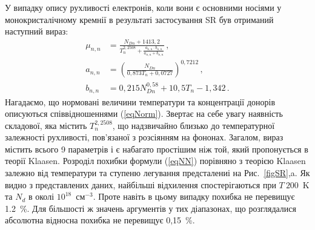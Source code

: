\documentclass[12pt,a4paper,titlepage,oneside]{book}
\numberwithin{equation}{part}
\begin{document}
У випадку опису рухливості електронів, коли вони є основними носіями у монокристалічному кремнії в результаті застосування SR був отриманий
наступний вираз:
\begin{subequations} \label{eqNN}
    \begin{align}
      \mu_{n,n}& =\frac{N_{Dn}+1413,2}{T_n^{2,2508}+\frac{a_{n,n}\cdot b_{n,n}}{a_{n,n}+b_{n,n}}}\,, \label{eqNNa} \\
      a_{n,n} &=\left(\frac{N_{Dn}}{0,873T_n+0,0727}\right)^{0,7212}\,, \label{eqNNb} \\
      b_{n,n}& =0,215N_{Dn}^{0,58}+10,5T_n-1,342\,. \label{eqNNc}
    \end{align}
\end{subequations}
Нагадаємо, що нормовані величини температури та концентрації донорів описуються співвідношеннями (\ref{eqNorm}).
Звертає на себе увагу наявність складової, яка містить $T_n^{2,2508}$, що надзвичайно близько до
температурної залежності рухливості, пов'язаної з розсіянням на фононах.
Загалом, вираз містить всього 9 параметрів і є набагато простішим ніж той, який пропонується в теорії Klaasen.
Розроділ похибки формули (\ref{eqNN}) порівняно з теорією  Klaasen залежно від температури та ступеню легування предсталениі на Рис.~\ref{figSR},a.
Як видно з представлених даних, найбільші відхилення спостерігаються при $T~200$~K та $N_d$ в околі $10^{18}$~см$^{-3}$.
Проте навіть в цьому випадку похибка не перевищує 1.2~\%.
Для більшості ж значень аргументів у тих діапазонах, що розглядалися абсолютна відносна похибка не перевищує 0,15~\%.
\end{document}
